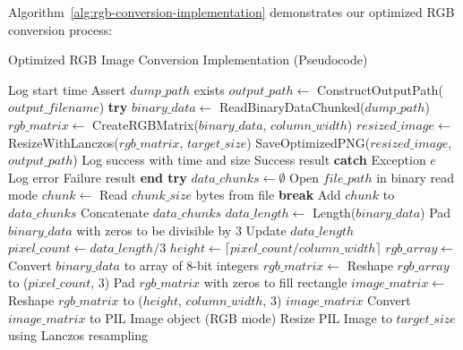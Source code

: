 Algorithm~\ref{alg:rgb-conversion-implementation} demonstrates our optimized RGB conversion process:

\begin{algorithm}[!htbp]
\caption{Optimized RGB Image Conversion Implementation (Pseudocode)}
\label{alg:rgb-conversion-implementation}
\begin{algorithmic}[1]
    \State Log start time
    \State Assert $dump\_path$ exists
    \State $output\_path \leftarrow$ ConstructOutputPath($output\_filename$)
    \State \textbf{try}
        \State $binary\_data \leftarrow$ ReadBinaryDataChunked($dump\_path$)
        \State $rgb\_matrix \leftarrow$ CreateRGBMatrix($binary\_data$, $column\_width$)
        \State $resized\_image \leftarrow$ ResizeWithLanczos($rgb\_matrix$, $target\_size$)
        \State SaveOptimizedPNG($resized\_image$, $output\_path$)
        \State Log success with time and size
        \Return Success result
    \State \textbf{catch} {Exception $e$}
        \State Log error
        \Return Failure result
    \State \textbf{end try}
\EndProcedure
\Statex
{}
    \State $data\_chunks \leftarrow \emptyset$
    \State Open $file\_path$ in binary read mode
        \State $chunk \leftarrow$ Read $chunk\_size$ bytes from file
         \State \textbf{break} \EndIf
        \State Add $chunk$ to $data\_chunks$
    \EndWhile
    \Return Concatenate $data\_chunks$
\EndProcedure
\Statex
{}
    \State $data\_length \leftarrow$ Length($binary\_data$)
        \State Pad $binary\_data$ with zeros to be divisible by 3
        \State Update $data\_length$
    \EndIf
    \State $pixel\_count \leftarrow data\_length / 3$
    \State $height \leftarrow \lceil pixel\_count / column\_width \rceil$
    \State $rgb\_array \leftarrow$ Convert $binary\_data$ to array of 8-bit integers
    \State $rgb\_matrix \leftarrow$ Reshape $rgb\_array$ to ($pixel\_count$, 3)
        \State Pad $rgb\_matrix$ with zeros to fill rectangle
    \EndIf
    \State $image\_matrix \leftarrow$ Reshape $rgb\_matrix$ to ($height$, $column\_width$, 3)
    \Return $image\_matrix$
\EndProcedure
\Statex
{}
    \State Convert $image\_matrix$ to PIL Image object (RGB mode)
    \State Resize PIL Image to $target\_size$ using Lanczos resampling

\end{algorithmic}
\end{algorithm}
